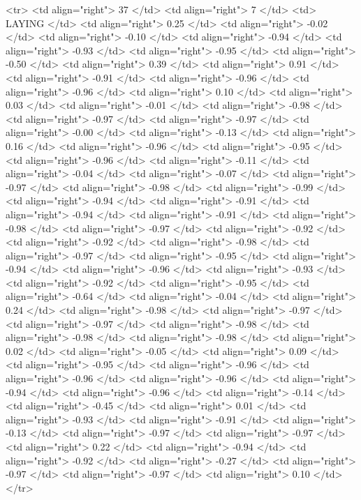   <tr> <td align="right"> 37 </td> <td align="right">   7 </td> <td> LAYING </td> <td align="right"> 0.25 </td> <td align="right"> -0.02 </td> <td align="right"> -0.10 </td> <td align="right"> -0.94 </td> <td align="right"> -0.93 </td> <td align="right"> -0.95 </td> <td align="right"> -0.50 </td> <td align="right"> 0.39 </td> <td align="right"> 0.91 </td> <td align="right"> -0.91 </td> <td align="right"> -0.96 </td> <td align="right"> -0.96 </td> <td align="right"> 0.10 </td> <td align="right"> 0.03 </td> <td align="right"> -0.01 </td> <td align="right"> -0.98 </td> <td align="right"> -0.97 </td> <td align="right"> -0.97 </td> <td align="right"> -0.00 </td> <td align="right"> -0.13 </td> <td align="right"> 0.16 </td> <td align="right"> -0.96 </td> <td align="right"> -0.95 </td> <td align="right"> -0.96 </td> <td align="right"> -0.11 </td> <td align="right"> -0.04 </td> <td align="right"> -0.07 </td> <td align="right"> -0.97 </td> <td align="right"> -0.98 </td> <td align="right"> -0.99 </td> <td align="right"> -0.94 </td> <td align="right"> -0.91 </td> <td align="right"> -0.94 </td> <td align="right"> -0.91 </td> <td align="right"> -0.98 </td> <td align="right"> -0.97 </td> <td align="right"> -0.92 </td> <td align="right"> -0.92 </td> <td align="right"> -0.98 </td> <td align="right"> -0.97 </td> <td align="right"> -0.95 </td> <td align="right"> -0.94 </td> <td align="right"> -0.96 </td> <td align="right"> -0.93 </td> <td align="right"> -0.92 </td> <td align="right"> -0.95 </td> <td align="right"> -0.64 </td> <td align="right"> -0.04 </td> <td align="right"> 0.24 </td> <td align="right"> -0.98 </td> <td align="right"> -0.97 </td> <td align="right"> -0.97 </td> <td align="right"> -0.98 </td> <td align="right"> -0.98 </td> <td align="right"> -0.98 </td> <td align="right"> 0.02 </td> <td align="right"> -0.05 </td> <td align="right"> 0.09 </td> <td align="right"> -0.95 </td> <td align="right"> -0.96 </td> <td align="right"> -0.96 </td> <td align="right"> -0.96 </td> <td align="right"> -0.94 </td> <td align="right"> -0.96 </td> <td align="right"> -0.14 </td> <td align="right"> -0.45 </td> <td align="right"> 0.01 </td> <td align="right"> -0.93 </td> <td align="right"> -0.91 </td> <td align="right"> -0.13 </td> <td align="right"> -0.97 </td> <td align="right"> -0.97 </td> <td align="right"> 0.22 </td> <td align="right"> -0.94 </td> <td align="right"> -0.92 </td> <td align="right"> -0.27 </td> <td align="right"> -0.97 </td> <td align="right"> -0.97 </td> <td align="right"> 0.10 </td> </tr>
